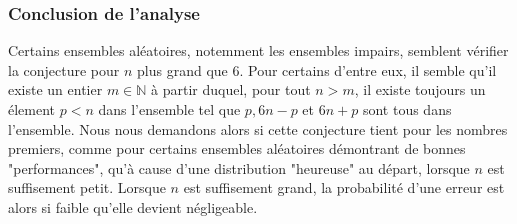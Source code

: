 \documentclass[../main.text]{report}
\begin{document}
\subsubsection{Conclusion de l'analyse}
Certains ensembles aléatoires, notemment les ensembles impairs, semblent vérifier la conjecture pour $n$ plus grand que 6. Pour certains d'entre eux, il semble qu'il existe un entier $m \in \mathbb{N}$ à partir duquel, pour tout $n > m$, il existe toujours un élement $p < n$ dans l'ensemble tel que $p, 6n-p$ et $6n+p$ sont tous dans l'ensemble. Nous nous demandons alors si cette conjecture tient pour les nombres premiers, comme pour certains ensembles aléatoires démontrant de bonnes "performances", qu'à cause d'une distribution "heureuse" au départ, lorsque $n$ est suffisement petit. Lorsque $n$ est suffisement grand, la probabilité d'une erreur est alors si faible qu'elle devient négligeable.  



\end{document}
